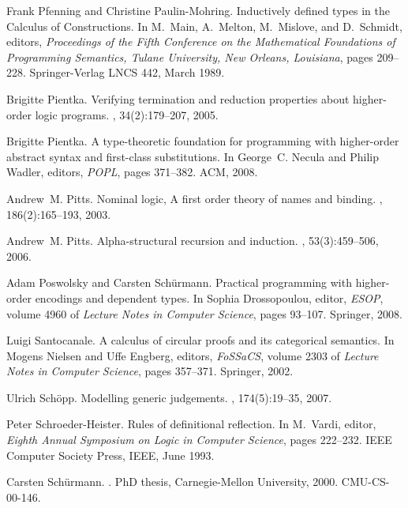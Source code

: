 \documentclass[preprint]{elsarticle}
\begin{document}
\begin{thebibliography}{10}
Frank Pfenning and Christine Paulin-Mohring.
\newblock Inductively defined types in the {Calculus of Constructions}.
\newblock In M.~Main, A.~Melton, M.~Mislove, and D.~Schmidt, editors, {\em
  Proceedings of the Fifth Conference on the Mathematical Foundations of
  Programming Semantics, Tulane University, New Orleans, Louisiana}, pages
  209--228. Springer-Verlag LNCS 442, March 1989.

Brigitte Pientka.
\newblock Verifying termination and reduction properties about higher-order
  logic programs.
, 34(2):179--207, 2005.

Brigitte Pientka.
\newblock A type-theoretic foundation for programming with higher-order
  abstract syntax and first-class substitutions.
\newblock In George~C. Necula and Philip Wadler, editors, {\em POPL}, pages
  371--382. ACM, 2008.

Andrew~M. Pitts.
\newblock Nominal logic, {A} first order theory of names and binding.
, 186(2):165--193, 2003.

Andrew~M. Pitts.
\newblock Alpha-structural recursion and induction.
, 53(3):459--506, 2006.

Adam Poswolsky and Carsten Sch{\"u}rmann.
\newblock Practical programming with higher-order encodings and dependent
  types.
\newblock In Sophia Drossopoulou, editor, {\em ESOP}, volume 4960 of {\em
  Lecture Notes in Computer Science}, pages 93--107. Springer, 2008.

Luigi Santocanale.
\newblock A calculus of circular proofs and its categorical semantics.
\newblock In Mogens Nielsen and Uffe Engberg, editors, {\em FoSSaCS}, volume
  2303 of {\em Lecture Notes in Computer Science}, pages 357--371. Springer,
  2002.

Ulrich Sch{\"o}pp.
\newblock Modelling generic judgements.
, 174(5):19--35, 2007.

Peter Schroeder-Heister.
\newblock Rules of definitional reflection.
\newblock In M.~Vardi, editor, {\em Eighth {Annual Symposium on Logic in
  Computer Science}}, pages 222--232. IEEE Computer Society Press, IEEE, June
  1993.

Carsten Sch{\"u}rmann.
.
\newblock PhD thesis, Carnegie-Mellon University, 2000.
\newblock CMU-CS-00-146.


\end{thebibliography}
\end{document}
